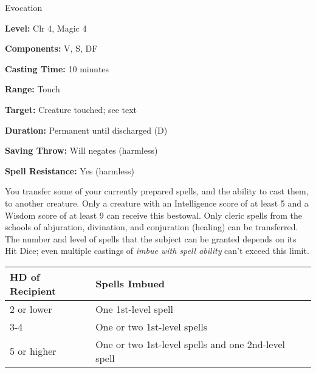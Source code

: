 
Evocation

\textbf{Level:} Clr 4, Magic 4

\textbf{Components:} V, S, DF

\textbf{Casting Time:} 10 minutes

\textbf{Range:} Touch

\textbf{Target:} Creature touched; see text

\textbf{Duration:} Permanent until discharged (D)

\textbf{Saving Throw:} Will negates (harmless)

\textbf{Spell Resistance:} Yes (harmless)

You transfer some of your currently prepared spells, and the ability to cast them, 
to another creature. Only a creature with an Intelligence score of at least 5 and 
a Wisdom score of at least 9 can receive this bestowal. Only cleric spells from 
the schools of abjuration, divination, and conjuration (healing) can be transferred. 
The number and level of spells that the subject can be granted depends on its Hit 
Dice; even multiple castings of \textit{imbue with spell ability} can't exceed 
this limit.

\begin{longtable}{llll}
\hline
\multicolumn{1}{|p{1.107in}|}{\begin{minipage}[t]{1.107in}\raggedright
\textbf{HD of Recipient}\end{minipage}} & \multicolumn{1}{p{2.966in}|}{\begin{minipage}[t]{2.966in}\raggedright
\textbf{Spells Imbued}\end{minipage}}\\
\hline
\multicolumn{1}{p{0.069in}|}{\begin{minipage}[t]{0.069in}\raggedright
2 or lower\end{minipage}} & \multicolumn{1}{p{0.069in}|}{\begin{minipage}[t]{0.069in}\raggedright
One 1st-level spell\end{minipage}}\\
\hline
\multicolumn{1}{|p{1.107in}|}{\begin{minipage}[t]{1.107in}\raggedright
3-4\end{minipage}} & \multicolumn{1}{p{2.966in}|}{\begin{minipage}[t]{2.966in}\raggedright
One or two 1st-level spells\end{minipage}}\\
\hline
\multicolumn{1}{p{0.069in}|}{\begin{minipage}[t]{0.069in}\raggedright
5 or higher\end{minipage}} & \multicolumn{1}{p{0.069in}|}{\begin{minipage}[t]{0.069in}\raggedright
One or two 1st-level spells and one 2nd-level spell\end{minipage}}\\
\hline
\end{longtable}

